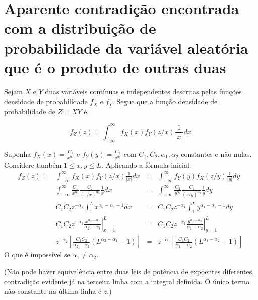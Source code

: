 \documentclass{article}
\begin{document}
\section{Aparente contradição encontrada com a distribuição de probabilidade da variável aleatória que é o produto de outras duas}


Sejam $X$ e $Y$ duas variáveis contínuas e independentes descritas
pelas funções densidade de probabilidade $f_X$ e $f_Y$.
Segue que a função densidade de probabilidade de $Z=XY$ é:

\begin{equation}
f_Z(z) = \int_{-\infty}^{\infty} f_X(x) f_Y(z/x)\frac{1}{|x|}dx
\end{equation}

\noindent Suponha 
$f_X(x)=\frac{C_1}{x^{\alpha_1}}$
e
$f_Y(y)=\frac{C_2}{y^{\alpha_2}}$
com $C_1, C_2, \alpha_1, \alpha_2$ constantes e não nulas.
Considere também $1 \leq x,y \leq L$.
Aplicando a fórmula inicial:
\begin{align}
f_Z(z) = & \int_{-\infty}^{\infty} f_X(x) f_Y(z/x)\frac{1}{|x|}dx & = & \int_{-\infty}^{\infty} f_Y(y) f_X(z/y)\frac{1}{|y|}dy\\
& \int_{-\infty}^{\infty} \frac{C_1}{x^{\alpha_1}} \frac{C_2}{(z/x)^{\alpha_2}}\frac{1}{x}dx & = & \int_{-\infty}^{\infty} \frac{C_2}{y^{\alpha_2}} \frac{C_1}{(z/y)^{\alpha_1}}\frac{1}{y}dy\\
& C_1 C_2 z^{-\alpha_2} \int_{1}^{L} x^{\alpha_2-\alpha_1-1} dx & = & C_1 C_2 z^{-\alpha_1} \int_{1}^{L} y^{\alpha_1-\alpha_2-1} dy\\
& C_1 C_2 z^{-\alpha_2} \left. \frac{x^{\alpha_2-\alpha_1}}{\alpha_2-\alpha_1}\right|_{x=1}^{L} & = & C_1 C_2 z^{-\alpha_1} \left. \frac{y^{\alpha_1-\alpha_2}}{\alpha_1-\alpha_2}\right|_{y=1}^{L}  \\
& z^{-\alpha_2} \left[ \frac{C_1 C_2}{\alpha_2-\alpha_1} (L^{\alpha_2-\alpha_1} -1)\right] & = & z^{-\alpha_1} \left[\frac{C_1 C_2}{\alpha_1-\alpha_2} (L^{\alpha_1-\alpha_2} -1)\right]
\end{align}
\noindent O que é impossível se $\alpha_1 \neq \alpha_2$.

(Não pode haver equivalência entre duas leis de potência de expoentes diferentes,
contradição evidente já na terceira linha com a integral definida.
O único termo não constante na última linha é $z$.)

\end{document}
